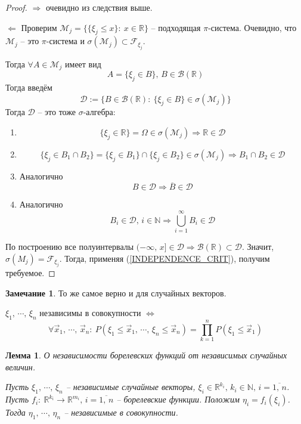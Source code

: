 \documentclass[a4paper,12pt]{article}
\renewcommand{\leq}{\ensuremath{\leqslant}}
\theoremstyle{plain}
\newtheorem{lemma}{Лемма}[section]
\theoremstyle{definition}
\newtheorem*{note}{Замечание}
\theoremstyle{remark}
\begin{document}
\begin{proof}
  $\Rightarrow$ очевидно из следствия выше.

  $\Leftarrow$ Проверим $\mathcal{M}_j = \{\{\xi_j \leq x\}:\: x \in \mathbb{R}\}$ -- подходящая $\pi$-система. Очевидно, что $\mathcal{M}_j$ -- это $\pi$-система и $\sigma(\mathcal{M}_j) \subset \mathcal{F}_{\xi_j}$.

  Тогда $\forall A \in \mathcal{M}_j$ имеет вид 
  \[A = \{\xi_j \in B\},\, B \in \mathcal{B}(\mathbb{R})\]
  Тогда введём
  \[\mathcal{D} := \{B \in \mathcal{B}(\mathbb{R}) :\: \{\xi_j \in B\} \in \sigma(\mathcal{M}_j)\}\]
  Тогда $\mathcal{D}$ -- это тоже $\sigma$-алгебра:
  \begin{enumerate}
    \item \[\{\xi_j \in \mathbb{R}\} = \Omega \in \sigma(\mathcal{M}_j) \Rightarrow \mathbb{R} \in \mathcal{D}\]
    \item \[\{\xi_j \in B_1 \cap B_2\} = \{\xi_j \in B_1\} \cap \{\xi_j \in B_2\} \in \sigma(\mathcal{M}_j) \Rightarrow B_1 \cap B_2 \in \mathcal{D}\]
    \item Аналогично
    \[B \in \mathcal{D} \Rightarrow \overline{B} \in \mathcal{D}\]
    \item Аналогично
    \[B_i \in \mathcal{D},\, i \in \mathbb{N} \Rightarrow \bigcup_{i = 1}^\infty B_i \in \mathcal{D}\]
  \end{enumerate}
  По построению все полуинтервалы $(-\infty,\, x] \in \mathcal{D} \Rightarrow \mathcal{B}(\mathbb{R}) \subset \mathcal{D}$. Значит, $\sigma(M_j) = \mathcal{F}_{\xi_j}$. Тогда, применяя (\ref{INDEPENDENCE_CRIT}), получим требуемое.
\end{proof}

\begin{note}
  То же самое верно и для случайных векторов.

  $\xi_1,\,\cdots,\,\xi_n$ независимы в совокупности $\Leftrightarrow$
  \[\forall \vec{x}_1,\,\cdots,\,\vec{x}_n :\: P(\xi_1 \leq \vec{x}_1,\,\cdots,\,\xi_n \leq \vec{x}_n) = \prod_{k = 1}^n P(\xi_1 \leq \vec{x}_1)\]
\end{note}

\begin{lemma}
  О независимости борелевских функций от независимых случайных величин.

  Пусть $\xi_1,\,\cdots,\,\xi_n$ -- независимые случайные векторы, $\xi_i \in \mathbb{R}^{k_i},\, k_i \in \mathbb{N},\, i = \overline{1,\,n}$. Пусть $f_i:\: \mathbb{R}^{k_i} \to \mathbb{R}^{m_i},\, i = \overline{1,\,n}$ -- борелевские функции. Положим $\eta_i = f_i(\xi_i)$. Тогда $\eta_1,\,\cdots,\,\eta_n$ -- независимые в совокупности.
\end{lemma}
\end{document}
